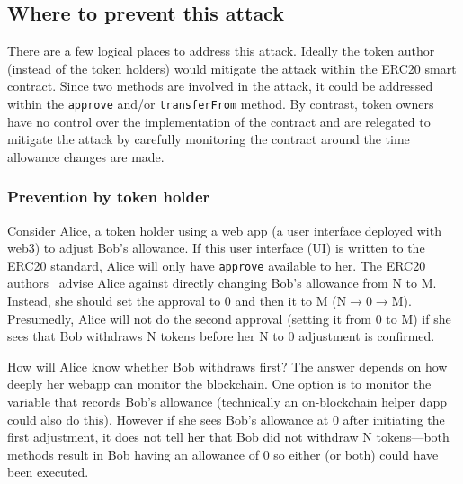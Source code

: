 \subsection{Where to prevent this attack}

There are a few logical places to address this attack. Ideally the token author (instead of the token holders) would mitigate the attack within the ERC20 smart contract. Since two methods are involved in the attack, it could be addressed within the \texttt{approve} and/or \texttt{transferFrom} method. By contrast, token owners have no control over the implementation of the contract and are relegated to mitigate the attack by carefully monitoring the contract around the time allowance changes are made.

\subsubsection*{Prevention by token holder}\label{sec:preho}

Consider Alice, a token holder using a web app (\eg a user interface deployed with web3) to adjust Bob's allowance. If this user interface (UI) is written to the ERC20 standard, Alice will only have \texttt{approve} available to her. The ERC20 authors~\cite{Ref08} advise Alice against directly changing Bob's allowance from N to M. Instead, she should set the approval to 0 and then it to M (N$\rightarrow$0$\rightarrow$M). Presumedly, Alice will not do the second approval (setting it from 0 to M) if she sees that Bob withdraws N tokens before her N to 0 adjustment is confirmed. 

How will Alice know whether Bob withdraws first? The answer depends on how deeply her webapp can monitor the blockchain. One option is to monitor the variable that records Bob's allowance (technically an on-blockchain helper dapp could also do this). However if she sees Bob's allowance at 0 after initiating the first adjustment, it does not tell her that Bob did not withdraw N tokens---both methods result in Bob having an allowance of 0 so either (or both) could have been executed.

